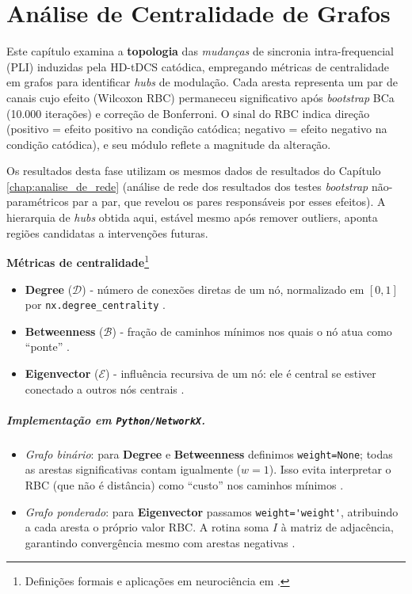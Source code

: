 \chapter{Análise de Centralidade de Grafos}
\label{chap:analise_centralidade_de_grafos}

Este capítulo examina a \textbf{topologia} das \emph{mudanças} de sincronia intra-frequencial (PLI) induzidas pela HD-tDCS catódica, empregando métricas de centralidade em grafos para identificar \textit{hubs} de modulação. Cada aresta representa um par de canais cujo efeito (Wilcoxon RBC) permaneceu significativo após \textit{bootstrap} BCa (10.000 iterações) e correção de Bonferroni. O sinal do RBC indica direção (positivo = efeito positivo na condição catódica; negativo = efeito negativo na condição catódica), e seu módulo reflete a magnitude da alteração.

Os resultados desta fase utilizam os mesmos dados de resultados do Capítulo \ref{chap:analise_de_rede} (análise de rede dos resultados dos testes \textit{bootstrap} não-paramétricos par a par, que revelou os pares responsáveis por esses efeitos). A hierarquia de \textit{hubs} obtida aqui, estável mesmo após remover outliers, aponta regiões candidatas a intervenções futuras.

\bigskip
\noindent\textbf{Métricas de centralidade}\footnote{Definições formais e aplicações em neurociência em .}
\begin{itemize}
  \item \textbf{Degree} (\(\mathcal{D}\)) - número de conexões diretas de um nó, normalizado em \([0,1]\) por \texttt{nx.degree\_centrality} \citep{networkx_doc}.
  \item \textbf{Betweenness} (\(\mathcal{B}\)) - fração de caminhos mínimos nos quais o nó atua como ``ponte'' .
  \item \textbf{Eigenvector} (\(\mathcal{E}\)) - influência recursiva de um nó: ele é central se estiver conectado a outros nós centrais \citep{lohmann2010eigenvector}.
\end{itemize}

\paragraph{Implementação em \texttt{Python/NetworkX}.}
\begin{itemize}
    \item \emph{Grafo binário}: para \textbf{Degree} e \textbf{Betweenness} definimos \verb|weight=None|; todas as arestas significativas contam igualmente (\(w=1\)).  
          Isso evita interpretar o RBC (que não é distância) como ``custo'' nos caminhos mínimos \citep{networkx_doc}.
    \item \emph{Grafo ponderado}: para \textbf{Eigenvector} passamos \verb|weight='weight'|, atribuindo a cada aresta o próprio valor RBC.  
          A rotina soma \(I\) à matriz de adjacência, garantindo convergência mesmo com arestas negativas \citep{networkx_doc}.
\end{itemize}

